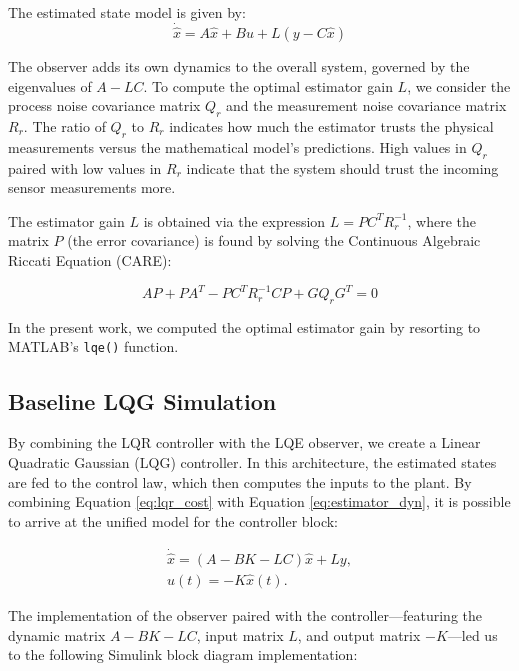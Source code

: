 \par The estimated state model is given by:
\begin{equation} \label{eq:estimator_dyn}
    \dot{\hat{x}} = A \hat{x} + Bu + L(y - C \hat{x})
\end{equation}

\par The observer adds its own dynamics to the overall system, governed by the eigenvalues of $A - LC$. To compute the optimal estimator gain $L$, we consider the process noise covariance matrix $Q_r$ and the measurement noise covariance matrix $R_r$. The ratio of $Q_r$ to $R_r$ indicates how much the estimator trusts the physical measurements versus the mathematical model's predictions. High values in $Q_r$ paired with low values in $R_r$ indicate that the system should trust the incoming sensor measurements more.

\par The estimator gain $L$ is obtained via the expression $L = P C^T R_r^{-1}$, where the matrix $P$ (the error covariance) is found by solving the Continuous Algebraic Riccati Equation (CARE):

\begin{equation}
A P + P A^T - P C^T R_r^{-1} C P + G Q_r G^T = 0
\end{equation}
\par In the present work, we computed the optimal estimator gain by resorting to MATLAB's \texttt{lqe()} function.

\subsection{Baseline LQG Simulation}
\par By combining the LQR controller with the LQE observer, we create a Linear Quadratic Gaussian (LQG) controller. In this architecture, the estimated states are fed to the control law, which then computes the inputs to the plant. By combining Equation \ref{eq:lqr_cost} with Equation \ref{eq:estimator_dyn}, it is possible to arrive at the unified model for the controller block:

\begin{gather}
\dot{\hat{x}} = (A - BK - LC)\hat{x} + Ly, \\
u(t) = -K\hat{x}(t).
\end{gather}

\par The implementation of the observer paired with the controller—featuring the dynamic matrix $A - BK - LC$, input matrix $L$, and output matrix $-K$—led us to the following Simulink block diagram implementation:

